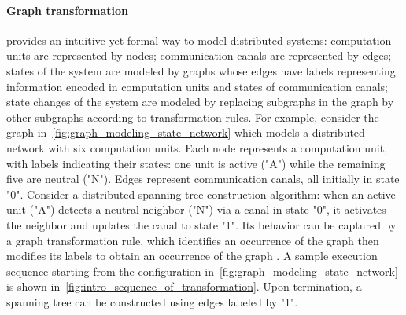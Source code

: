 \paragraph{Graph transformation} provides an intuitive yet formal way to model distributed systems: computation units are represented by nodes; communication canals are represented by edges; states of the system are modeled by graphs whose edges have labels representing information encoded in computation units and states of communication canals; state changes of the system are modeled by replacing subgraphs in the graph by other subgraphs according to transformation rules. 
For example, consider the graph in~\autoref{fig:graph_modeling_state_network} which models a distributed network with six computation units. Each node represents a computation unit, with labels indicating their states: one unit is active ("A") while the remaining five are neutral ("N"). Edges represent communication canals, all initially in state "0". Consider a distributed spanning tree construction algorithm: when an active unit ("A") detects a neutral neighbor ("N") via a canal in state "0", it activates the neighbor and updates the canal to state "1". Its behavior can be captured by a graph transformation rule, which identifies an occurrence of the graph  then modifies its labels to obtain an occurrence of the graph . 
A sample execution sequence starting from the configuration in~\autoref{fig:graph_modeling_state_network} is shown in~\autoref{fig:intro_sequence_of_transformation}. Upon termination, a spanning tree can be constructed using edges labeled by "1".
